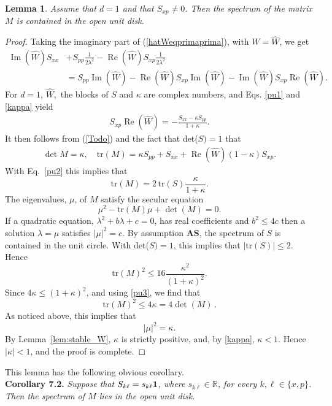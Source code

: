 \documentclass[12pt]{article}
\newtheorem{lemma}[theorem]{Lemma}
\renewcommand{\Re}{\operatorname{Re}}
\renewcommand{\Im}{\operatorname{Im}}
\newcommand{\tr }{\mathrm{tr}}
\begin{document}
\begin{lemma}\label{LLL1}
	Assume that $d =1$ and that $S_{xp} \neq 0$. Then the spectrum of the matrix $M$ is contained in the open unit disk.
\end{lemma}
\begin{proof}
	Taking the imaginary part of (\ref{hatWeqprimaprima}), with $W=\widehat{W}$, we get
	\begin{align}\label{pu1}
	\Im(\widehat W)S_{xx} &+  S_{pp} \frac{1}{2 \lambda^2} - \Re(\widehat W) S_{xp}
	\frac{1}{2 \lambda^2} \nonumber \\
	&= S_{pp} \Im(\widehat W) - \Re(\widehat W) S_{xp} \Im(\widehat W) -
	\Im(\widehat W) S_{xp} \Re(\widehat W).
	\end{align}
	For $d = 1$, $\widehat W,$ the blocks of $S$ and $\kappa$ are complex numbers, and Eqs. \eqref{pu1} and \eqref{kappa} 
	yield
	\begin{align}\label{pu2}
	S_{xp} \Re(\widehat{W}) = - \frac{S_{xx} - \kappa S_{pp}}{1 + \kappa}.
	\end{align}
	It then follows from  (\ref{Todo}) and the fact that det($S)=1$ that
	\begin{align}\label{pu3}
	\det{M} = \kappa, \quad \tr(M) = \kappa S_{pp} + S_{xx} + \Re(\widehat{W}) (1 - \kappa) S_{xp}.
	\end{align}
	With Eq.~\eqref{pu2} this implies that
	$$
	\tr(M) = 2\, \tr(S) \frac{\kappa}{1+ \kappa}.
	$$
	The eigenvalues, $\mu$, of $M$ satisfy the secular equation
	$$
	\mu^2 - \tr(M) \mu + \det(M) = 0.
	$$
 If a quadratic equation, $\lambda^2 + b \lambda + c = 0$, has real coefficients and $b^2 \leq  4 c$ then a solution 
	$\lambda=\mu$ satisfies $|\mu|^2=c$. By assumption {\bf{AS}}, the spectrum of $S$ is 
	contained in the unit circle. With det($S)=1$, this implies that
	$ |\tr(S)| \leq 2. $
	Hence 
	$$
	\tr(M)^2 \leq 16 \frac{\kappa^2}{(1+ \kappa)^2}.
	$$
	Since $4 \kappa \leq (1 + \kappa)^2$, and using \eqref{pu3}, we find that 
	$$\tr(M)^2 \leq 4 \kappa =  4 \det(M)\,.$$ 
	As noticed above, this implies that
	$$
\vert\mu\vert^2=\kappa.
	$$
	By Lemma~\ref{lem:stable_W}, $\kappa $ is strictly positive, and, by \eqref{kappa}, $\kappa  < 1$. Hence $\vert \kappa \vert <1$, and the proof is complete.
\end{proof}
This lemma has the following obvious corollary.\\

\noindent
{\bf{Corollary 7.2.}}\label{LLL2} \textit{Suppose that  $S_{k\ell} =  s_{k\ell} {\bf{1}} $, where $s_{k\ell} \in \mathbb{R} $, for every $k,\ell \in \{ x, p\} $. Then the spectrum of  $M $ lies in the open unit disk. } \\
\end{document}
